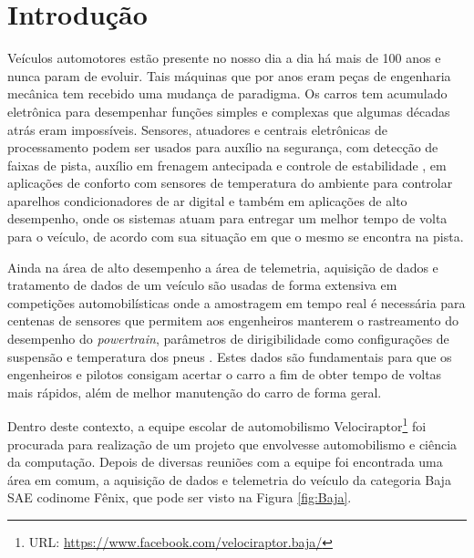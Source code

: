 \chapter{Introdução} 
	\label{ch:introducao}

Veículos automotores estão presente no nosso dia a dia há mais de 100 anos \cite{fordt} e nunca param de evoluir. Tais  máquinas que por anos eram peças de engenharia mecânica tem recebido uma mudança de paradigma. Os carros tem acumulado eletrônica para desempenhar funções simples e complexas que algumas décadas atrás eram impossíveis. Sensores, atuadores e centrais eletrônicas de processamento podem ser usados para auxílio na segurança, com detecção de faixas de pista, auxílio em frenagem antecipada e controle de estabilidade \cite{racecarInstrumentationFor2012}, em aplicações de conforto com sensores de temperatura do ambiente para controlar aparelhos condicionadores de ar digital e também em aplicações de alto desempenho, onde os sistemas atuam para entregar um melhor tempo de volta para o veículo, de acordo com sua situação em que o mesmo se encontra na pista.

Ainda na área de alto desempenho a área de telemetria, aquisição de dados e tratamento de dados de um veículo são usadas de forma extensiva em competições automobilísticas onde a amostragem em tempo real é necessária para centenas de sensores que permitem aos engenheiros manterem o rastreamento do desempenho do \textit{powertrain}, parâmetros de dirigibilidade como configurações de suspensão e temperatura dos pneus \cite{designAndImplementation2015}. Estes dados são fundamentais para que os engenheiros e pilotos consigam acertar o carro a fim de obter tempo de voltas mais rápidos, além de melhor manutenção do carro de forma geral.

Dentro deste contexto, a equipe escolar de automobilismo Velociraptor\footnote{URL: \url{https://www.facebook.com/velociraptor.baja/}} foi procurada para realização de um projeto que envolvesse automobilismo e ciência da computação. Depois de diversas reuniões com a equipe foi encontrada uma área em comum, a aquisição de dados e telemetria do veículo da categoria Baja SAE codinome Fênix, que pode ser visto na Figura \ref{fig:Baja}. 


